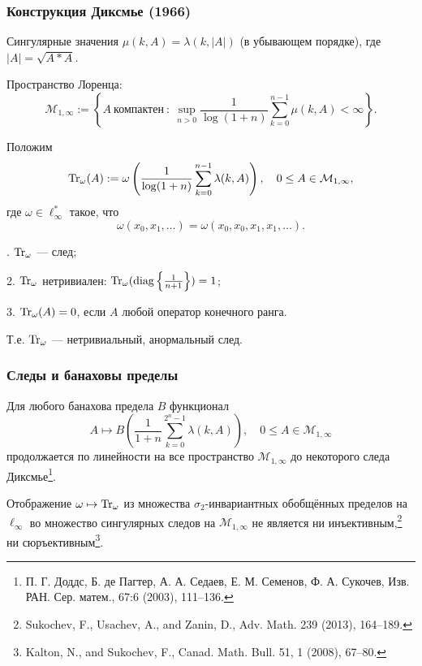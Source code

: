  \begin{frame}\frametitle{Конструкция Диксмье (1966)}

	Сингулярные значения $\mu(k,A)=\lambda(k,|A|)$ (в убывающем порядке),
	где $|A|=\sqrt{A*A}$.

	Пространство Лоренца:
	$$\mathcal M_{1,\infty} := \left\{ A \ \text{компактен} \ : \ \sup_{n> 0}  \frac{1}{\log(1+n)} \sum_{k=0}^{n-1} \mu(k,A) < \infty \right \}.$$

	Положим
	$${\rm Tr}_\omega (A):= \omega \left( \frac{1}{\log(1+n)} \sum_{k=0}^{n-1} \lambda(k,A) \right), \quad 0\le A \in \mathcal M_{1,\infty},$$
	где $\omega\in \ell_\infty^*$ такое, что
	$$\omega(x_0, x_1, \dots)=\omega(x_0, x_0, x_1, x_1, \dots).$$


	. ${\rm Tr}_\omega$ --- след;

	2. ${\rm Tr}_\omega$ нетривиален: ${\rm Tr}_\omega ({\rm diag} \left\{ \frac1{n+1} \right\})=1$;

	3. ${\rm Tr}_\omega(A)=0$, если $A$ любой оператор конечного ранга.
	\bigskip

	\begin{center}
	Т.е. ${\rm Tr}_\omega$ --- нетривиальный, анормальный след.
	\end{center}
\end{frame}





\begin{frame}\frametitle{Следы и банаховы пределы}
	 Для любого банахова предела $B$ функционал
	 $$A \mapsto B \left( \frac{1}{1+n} \sum_{k=0}^{2^n-1} \lambda(k,A) \right), \quad 0\le A \in \mathcal M_{1,\infty}$$
	продолжается по линейности на все пространство $\mathcal M_{1,\infty}$ до некоторого следа Диксмье\footnote{П. Г. Доддс, Б. де Пагтер, А. А. Седаев, Е. М. Семенов, Ф. А. Сукочев, Изв. РАН. Сер. матем., 67:6 (2003),  111–136.}.

	\vfill

		Отображение $\omega \mapsto {\rm Tr}_\omega$ из множества $\sigma_2$-инвариантных обобщённых пределов на $\ell_\infty$ во множество сингулярных следов на $\mathcal M_{1,\infty}$ не является ни инъективным,\footnote{Sukochev, F., Usachev, A., and Zanin, D., Adv. Math. 239 (2013), 164--189.
	} ни сюръективным\footnote{Kalton, N., and Sukochev, F., Canad. Math. Bull. 51, 1 (2008), 67--80.}.
\end{frame}




